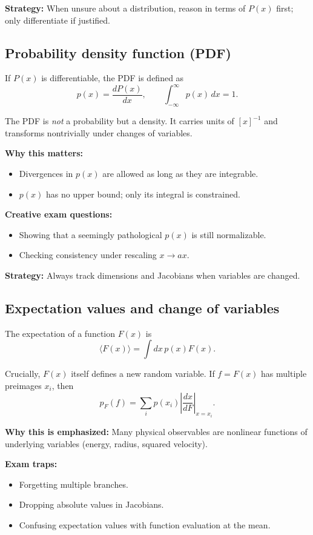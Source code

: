 \documentclass[9pt,twocoloumn]{article}
\begin{document}
\textbf{Strategy:} When unsure about a distribution, reason in terms of $P(x)$ first; only differentiate if justified.

\subsection*{Probability density function (PDF)}
If $P(x)$ is differentiable, the PDF is defined as
\[
p(x) = \frac{dP(x)}{dx},
\qquad
\int_{-\infty}^{\infty} p(x)\,dx = 1.
\]

The PDF is \emph{not} a probability but a density. It carries units of $[x]^{-1}$ and transforms nontrivially under changes of variables.

\textbf{Why this matters:}
\begin{itemize}
\item Divergences in $p(x)$ are allowed as long as they are integrable.
\item $p(x)$ has no upper bound; only its integral is constrained.
\end{itemize}

\textbf{Creative exam questions:}
\begin{itemize}
\item Showing that a seemingly pathological $p(x)$ is still normalizable.
\item Checking consistency under rescaling $x \to ax$.
\end{itemize}

\textbf{Strategy:} Always track dimensions and Jacobians when variables are changed.

\subsection*{Expectation values and change of variables}
The expectation of a function $F(x)$ is
\[
\langle F(x) \rangle = \int dx\, p(x) F(x).
\]

Crucially, $F(x)$ itself defines a new random variable. If $f=F(x)$ has multiple preimages $x_i$, then
\[
p_F(f) = \sum_i p(x_i)\left|\frac{dx}{dF}\right|_{x=x_i}.
\]

\textbf{Why this is emphasized:} Many physical observables are nonlinear functions of underlying variables (energy, radius, squared velocity).

\textbf{Exam traps:}
\begin{itemize}
\item Forgetting multiple branches.
\item Dropping absolute values in Jacobians.
\item Confusing expectation values with function evaluation at the mean.
\end{itemize}
\end{document}
